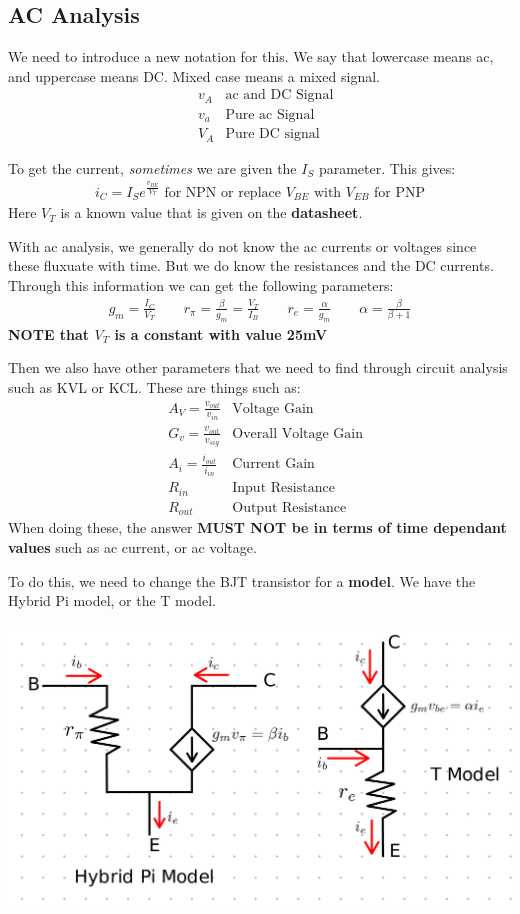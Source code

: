 \documentclass[12pt,letterpaper]{article} \usepackage{amsmath} \usepackage{graphicx} \usepackage[margin=1in]{geometry} \usepackage{longtable}  \usepackage{amssymb}
\begin{document}
	\subsection{AC Analysis}
	We need to introduce a new notation for this. We say that lowercase means ac, and uppercase means DC. Mixed case means a mixed signal.
	\begin{align*}
		&v_A& \text{ac and DC Signal}\\
		&v_a &\text{Pure ac Signal}\\
		&V_A &\text{Pure DC signal}
	\end{align*}

	To get the current, \textit{sometimes} we are given the $I_S$ parameter. This gives:
	\begin{align*}
		i_C = I_S e^{\frac{v_{BE}}{V_T}} \text{ for NPN or replace $V_{BE}$ with $V_{EB}$ for PNP}
	\end{align*}
	Here $V_T$ is a known value that is given on the \textbf{datasheet}. 
	
	With ac analysis, we generally do not know the ac currents or voltages since these fluxuate with time. But we do know the resistances and the DC currents. Through this information we can get the following parameters:
	\begin{align*}
		g_m = \frac{I_C}{V_T} \qquad r_\pi  =\frac{\beta}{g_m} = \frac{V_T}{I_B} \qquad r_e = \frac{\alpha}{g_m}\qquad \alpha = \frac{\beta}{\beta+1}
	\end{align*}
	\textbf{NOTE that $V_T$ is a constant with value 25mV}
	
	Then we also have other parameters that we need to find through circuit analysis such as KVL or KCL. These are things such as:
	\begin{align*}
		&A_V = \frac{v_{out}}{v_{in}}&\text{Voltage Gain}\\
		&G_v = \frac{v_{out}}{v_{sig}}&\text{Overall Voltage Gain}\\
		&A_i = \frac{i_{out}}{i_{in}}&\text{Current Gain}\\
		&R_{in} &\text{Input Resistance}\\
		&R_{out}&\text{Output Resistance} 
	\end{align*}
	When doing these, the answer \textbf{MUST NOT be in terms of time dependant values} such as ac current, or ac voltage.
	
	To do this, we need to change the BJT transistor for a \textbf{model}. We have the Hybrid Pi model, or the T model. 
	\begin{center}
		\includegraphics[width=0.8\linewidth]{hybridpi-tmodel}
	\end{center}
	
\end{document}
